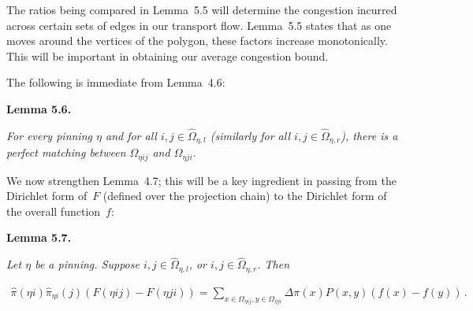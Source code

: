 \documentclass[10pt,a4paper]{article}
\begin{document}
The ratios being compared in Lemma 5.5 will determine the congestion incurred across certain sets of edges in our transport flow. Lemma 5.5 states that as one moves around the vertices of the polygon, these factors increase monotonically. This will be important in obtaining our average congestion bound.\par




The following is immediate from Lemma 4.6:\par





\par\medskip\noindent\textbf{\textbf{Lemma 5.6}\textbf{.}}\par



\emph{For every pinning $\eta$ and for all $i,j\in\hat{\Omega}_{\eta,l}$ (similarly for all $i,j\in\hat{\Omega}_{\eta,r}$), there is a perfect matching between $\Omega_{\eta ij}$ and $\Omega_{\eta ji}$.}\par






We now strengthen Lemma 4.7; this will be a key ingredient in passing from the Dirichlet form of $F$ (defined over the projection chain) to the Dirichlet form of the overall function $f$:\par





\par\medskip\noindent\textbf{\textbf{Lemma 5.7}\textbf{.}}\par



\emph{Let $\eta$ be a pinning. Suppose $i,j\in\hat{\Omega}_{\eta,l}$, or $i,j\in\hat{\Omega}_{\eta,r}$. Then}\par


\[\begin{gathered}
\displaystyle\hat{\pi}(\eta i)\hat{\pi}_{\eta i}(j)(F(\eta ij)-F(\eta ji)) \displaystyle=\sum_{x\in\Omega_{\eta ij},y\in\Omega_{\eta ji}}\Delta\pi(x)P(x,y)(f(x)-f(y))\,.
\end{gathered}\]



\end{document}
